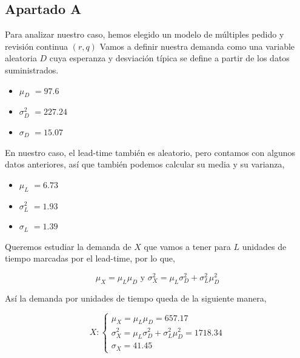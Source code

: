 \documentclass[a4paper,12pt]{article}
\begin{document}


\subsection{Apartado A}
Para analizar nuestro caso, hemos elegido un modelo de m\'ultiples pedido y revisi\'on continua $(r,q)$ 
Vamos a definir nuestra demanda como una variable aleatoria $D$ cuya esperanza y desviaci\'on t\'ipica se define a partir de los datos suministrados.

\begin{itemize}
\item[] \textbf{$\mu_D$} $= 97.6$
\item[] \textbf{$\sigma_D^2$} $= 227.24$
\item[] \textbf{$\sigma_D$} $= 15.07$
\end{itemize}

En nuestro caso, el lead-time tambi\'en es aleatorio, pero contamos con algunos datos anteriores, as\'i que tambi\'en podemos calcular su media y su varianza,

\begin{itemize}
\item[] \textbf{$\mu_L$} $= 6.73$
\item[] \textbf{$\sigma_L^2$} $= 1.93$
\item[] \textbf{$\sigma_L$} $= 1.39$
\end{itemize}

Queremos estudiar la demanda de $X$ que vamos a tener para $L$ unidades de tiempo marcadas por el lead-time, por lo que,

$$\mu_X = \mu_L \mu_D \text{ y } \sigma_X^2 = \mu_L \sigma_D^2 + \sigma_L^2 \mu_D^2$$

As\'i la demanda por unidades de tiempo queda de la siguiente manera,


	\begin{equation*}
	X:  \left\lbrace \begin{array}{l}
		\mu_X = \mu_L \mu_D = 657.17\\
		\sigma_X^2 = \mu_L \sigma_D^2 + \sigma_L^2 \mu_D^2 = 1718.34\\
		\sigma_X = 41.45
	\end{array}
	\right. 
	\end{equation*}
\end{document}
